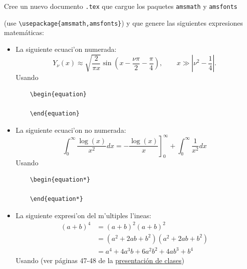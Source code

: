 \documentclass[11pt]{exam}
\begin{document}
\begin{questions}

\item Cree un nuevo documento \texttt{.tex} que cargue los paquetes \texttt{amsmath} y \texttt{amsfonts} 

(use \verb|\usepackage{amsmath,amsfonts}|) y que genere las siguientes expresiones matem\'aticas:
\begin{itemize}

\item La siguiente ecuaci'on numerada:
\begin{equation}\label{asinNnu}
Y_\nu(x)\approx \sqrt{\frac{2}{\pi x}}\sin\left(x-\frac{\nu\pi}{2}-\frac{\pi}{4}\right), 
\qquad x\gg\left|\nu^2-\frac{1}{4}\right|.
\end{equation}
Usando 

\begin{verbatim}
	\begin{equation}

	\end{equation}
\end{verbatim}
\item La siguiente ecuaci'on no numerada:
\begin{equation*}
\int_{0}^{\infty }\frac{\log (x)}{x^{2}}dx=-\left. \frac{\log (x)}{x}\right]
_{0}^{\infty }+\int_{0}^{\infty }\frac{1}{x^{2}}dx
\end{equation*}
Usando

\begin{verbatim}
	\begin{equation*}

	\end{equation*}
\end{verbatim}
\item La siguiente expresi'on del m'ultiples l'ineas:
\begin{align} 
(a+b)^4 &= (a+b)^2 (a+b)^2 \\
 &= (a^2+2ab+b^2) (a^2+2ab+b^2) \\
 &= a^4+4 a^3 b + 6 a^2 b^2 +4 a b^3 +b^4
\end{align}
Usando (ver páginas 47-48 de la \href{https://udec.instructure.com/courses/40179/pages/latex-pdf-presentacion?module_item_id=1465499}{presentación de clases})


\end{itemize}
\end{questions}
\end{document}
